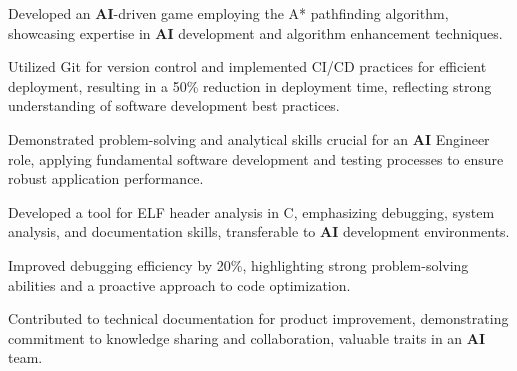 \begin{minipage}[t]{0.63\textwidth}
    \vspace{5pt}
    \begin{tightemize}
      \item Developed an \textbf{AI}-driven game employing the A* pathfinding algorithm, showcasing expertise in \textbf{AI} development and algorithm enhancement techniques.
      \item Utilized Git for version control and implemented CI/CD practices for efficient deployment, resulting in a 50\% reduction in deployment time, reflecting strong understanding of software development best practices.
      \item Demonstrated problem-solving and analytical skills crucial for an \textbf{AI} Engineer role, applying fundamental software development and testing processes to ensure robust application performance.
    \end{tightemize}
  \sectionsep

    \vspace{5pt}
    \begin{tightemize}
      \item Developed a tool for ELF header analysis in C, emphasizing debugging, system analysis, and documentation skills, transferable to \textbf{AI} development environments.
      \item Improved debugging efficiency by 20\%, highlighting strong problem-solving abilities and a proactive approach to code optimization.
      \item Contributed to technical documentation for product improvement, demonstrating commitment to knowledge sharing and collaboration, valuable traits in an \textbf{AI} team.
    \end{tightemize}
  \sectionsep


\end{minipage}

